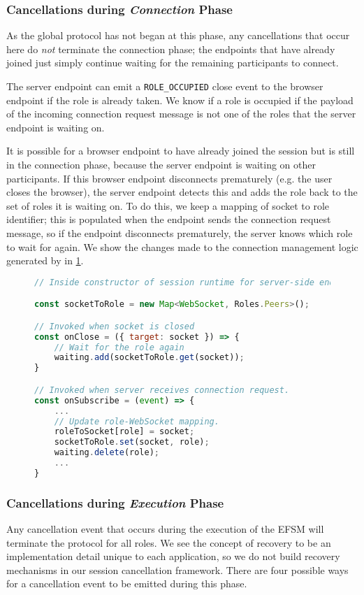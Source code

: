 \subsubsection{Cancellations during \textit{Connection} Phase}
As the global protocol has not began at this phase,
any cancellations that occur here do \textit{not} terminate
the connection phase; the endpoints that have already
joined just simply continue waiting for the remaining participants
to connect.

The server endpoint can emit a \texttt{ROLE_OCCUPIED} close event
to the browser endpoint if the role is already taken.
We know if a role is occupied if the payload of the
incoming connection request message is not one of the roles
that the server endpoint is waiting on.

It is possible for a browser endpoint to have already joined
the session but is still in the connection phase, because the
server endpoint is waiting on other participants. If this browser
endpoint disconnects prematurely (e.g. the user closes
the browser), the server endpoint detects this and adds the role
back to the set of roles it is waiting on. To do this, we keep
a mapping of socket to role identifier; this is populated
when the endpoint sends the connection request message,
so if the endpoint disconnects prematurely, the server knows
which role to wait for again. We show the changes made to 
the connection management logic generated by 
in \cref{lst:cancelconnectsvr}.

\begin{figure}[!h]
\begin{lstlisting}[language=javascript]
// Inside constructor of session runtime for server-side endpoint

const socketToRole = new Map<WebSocket, Roles.Peers>();

// Invoked when socket is closed
const onClose = ({ target: socket }) => {
	// Wait for the role again
	waiting.add(socketToRole.get(socket));
}

// Invoked when server receives connection request.
const onSubscribe = (event) => {
	...
	// Update role-WebSocket mapping.
	roleToSocket[role] = socket;
	socketToRole.set(socket, role);
	waiting.delete(role);
	...
}
\end{lstlisting}
\label{lst:cancelconnectsvr}
\end{figure}


\subsubsection{Cancellations during \textit{Execution} Phase}
Any cancellation event that occurs during the execution of the
EFSM will terminate the protocol for all roles.
We see the concept of recovery to be an implementation detail
unique to each application, so we do not build recovery
mechanisms in our session cancellation framework.
There are four possible ways for a cancellation event
to be emitted during this phase.

